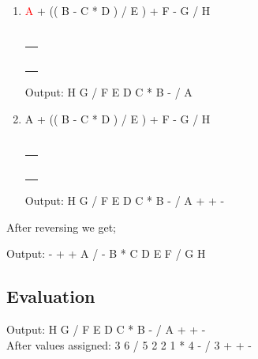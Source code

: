 \documentclass[a4paper]{article}
\begin{document}
\begin{large}
\begin{enumerate}
          \renewcommand{\arraystretch}{1.3} \item
          \textcolor{red}{A} + (( B - C * D ) / E ) + F - G / H\\\\
          \begin{tabular}[t]{ | p{1em} | }
            \makecell{}  \\ \hline
            \makecell{}  \\ \hline
            \makecell{}  \\ \hline
            \makecell{+} \\ \hline
            \makecell{+} \\\hline
            \makecell{-} \\\hline
          \end{tabular}
          \hspace{2em}
          Output: H G / F E D C * B - / A
          \newpage

          \renewcommand{\arraystretch}{1.3} \item
          A + (( B - C * D ) / E ) + F - G / H\\\\
          \begin{tabular}[t]{ | p{1em} | }
            \makecell{} \\ \hline
            \makecell{} \\ \hline
            \makecell{} \\ \hline
            \makecell{} \\ \hline
            \makecell{} \\\hline
            \makecell{} \\\hline
          \end{tabular}
          \hspace{2em}
          Output: H G / F E D C * B - / A + + -

  \end{enumerate}
  After reversing we get;

  Output:   - + + A / - B * C D E F / G H

  \newpage

  \subsection*{Evaluation}

  Output: H G / F E D C * B - / A + + -\\
  After values assigned: 3 6 / 5 2 2 1 * 4 - / 3 + + -


\end{large}
\end{document}
